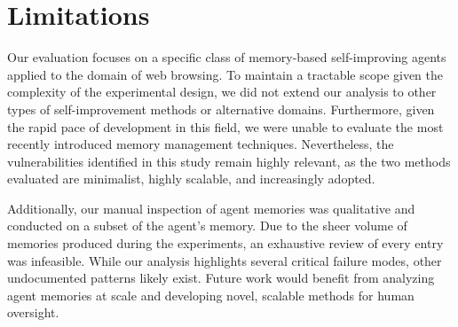 \documentclass{article}
\begin{document}






 


\appendix
\section{Limitations}
\label{app:limitations}

Our evaluation focuses on a specific class of memory-based self-improving agents applied to the domain of web browsing. To maintain a tractable scope given the complexity of the experimental design, we did not extend our analysis to other types of self-improvement methods or alternative domains. Furthermore, given the rapid pace of development in this field, we were unable to evaluate the most recently introduced memory management techniques. Nevertheless, the vulnerabilities identified in this study remain highly relevant, as the two methods evaluated are minimalist, highly scalable, and increasingly adopted.

Additionally, our manual inspection of agent memories was qualitative and conducted on a subset of the agent's memory. Due to the sheer volume of memories produced during the experiments, an exhaustive review of every entry was infeasible. While our analysis highlights several critical failure modes, other undocumented patterns likely exist. Future work would benefit from analyzing agent memories at scale and developing novel, scalable methods for human oversight.
\end{document}
